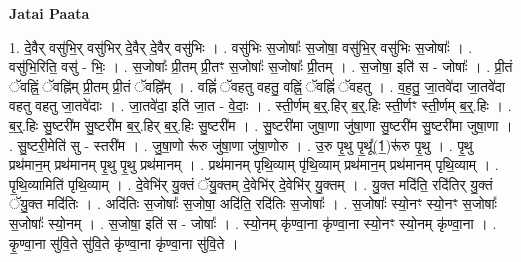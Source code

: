 \documentclass[17pt]{extarticle}
\begin{document}
\textbf{Jatai Paata} \newline

1. दे॒वैर् वसु॑भि॒र् वसु॑भिर् दे॒वैर् दे॒वैर् वसु॑भिः । . वसु॑भिः स॒जोषाः᳚ स॒जोषा॒ वसु॑भि॒र् वसु॑भिः स॒जोषाः᳚ । . वसु॑भि॒रिति॒ वसु॑ - भिः॒ । . स॒जोषाः᳚ प्री॒तम् प्री॒तꣳ स॒जोषाः᳚ स॒जोषाः᳚ प्री॒तम् । . स॒जोषा॒ इति॑ स - जोषाः᳚ । . प्री॒तं ॅवह्निं॒ ॅवह्नि॑म् प्री॒तम् प्री॒तं ॅवह्नि᳚म् । . वह्निं॑ ॅवहतु वहतु॒ वह्निं॒ ॅवह्निं॑ ॅवहतु । . व॒ह॒तु॒ जा॒तवे॑दा जा॒तवे॑दा वहतु वहतु जा॒तवे॑दाः । . जा॒तवे॑दा॒ इति॑ जा॒त - वे॒दाः॒ । . स्ती॒र्णम् ब॒र्॒.हिर् ब॒र्॒.हिः स्ती॒र्णꣳ स्ती॒र्णम् ब॒र्॒.हिः । . ब॒र्॒.हिः सु॒ष्टरी॑म सु॒ष्टरी॑म ब॒र्॒.हिर् ब॒र्॒.हिः सु॒ष्टरी॑म । . सु॒ष्टरी॑मा जुषा॒णा जु॑षा॒णा सु॒ष्टरी॑म सु॒ष्टरी॑मा जुषा॒णा । . सु॒ष्टरी॒मेति॑ सु - स्तरी॑म । . जु॒षा॒णो रू॑रु जु॑षा॒णा जु॑षा॒णोरु । . उ॒रु पृ॒थु पृ॒थू᳚(1॒)रू॑रु पृ॒थु । . पृ॒थु प्रथ॑मान॒म् प्रथ॑मानम् पृ॒थु पृ॒थु प्रथ॑मानम् । . प्रथ॑मानम् पृथि॒व्याम् पृ॑थि॒व्याम् प्रथ॑मान॒म् प्रथ॑मानम् पृथि॒व्याम् । . पृ॒थि॒व्यामिति॑ पृथि॒व्याम् । . दे॒वेभि॑र् यु॒क्तं ॅयु॒क्तम् दे॒वेभि॑र् दे॒वेभि॑र् यु॒क्तम् । . यु॒क्त मदि॑ति॒ रदि॑तिर् यु॒क्तं ॅयु॒क्त मदि॑तिः । . अदि॑तिः स॒जोषाः᳚ स॒जोषा॒ अदि॑ति॒ रदि॑तिः स॒जोषाः᳚ । . स॒जोषाः᳚ स्यो॒नꣳ स्यो॒नꣳ स॒जोषाः᳚ स॒जोषाः᳚ स्यो॒नम् । . स॒जोषा॒ इति॑ स - जोषाः᳚ । . स्यो॒नम् कृ॑ण्वा॒ना कृ॑ण्वा॒ना स्यो॒नꣳ स्यो॒नम् कृ॑ण्वा॒ना । . कृ॒ण्वा॒ना सु॑वि॒ते सु॑वि॒ते कृ॑ण्वा॒ना कृ॑ण्वा॒ना सु॑वि॒ते । \newline
\end{document}
